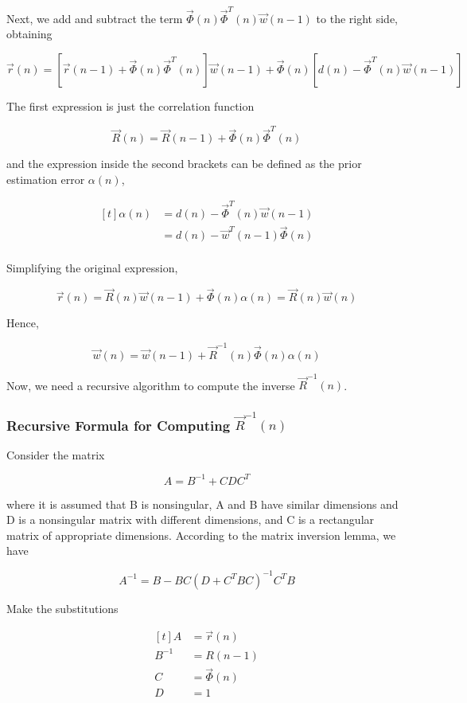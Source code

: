 \documentclass{article}
\begin{document}
Next, we add and subtract the term $ \vec{\Phi} (n) \vec{\Phi}^{T} (n) \vec{w} (n - 1) $ to the right side, obtaining

$$ \vec{r} (n) = [ \vec{r} (n - 1) + \vec{\Phi} (n) \vec{\Phi}^{T} (n) ] \vec{w} (n - 1) + \vec{\Phi} (n) [d (n) - \vec{\Phi}^{T} (n) \vec{w} (n - 1)] $$

The first expression is just the correlation function

$$ \vec{R} (n) = \vec{R} (n - 1) + \vec{\Phi} (n) \vec{\Phi}^{T} (n) $$

\noindent and the expression inside the second brackets can be defined as the prior estimation error $ \alpha (n) $, 

$$ 
\begin{aligned}[t]
	\alpha (n) &= d (n) - \vec{\Phi}^{T} (n) \vec{w} (n - 1) \\
		   &= d (n) - \vec{w}^{T} (n - 1) \vec{\Phi} (n) \\
\end{aligned}
$$

Simplifying the original expression,

$$ \vec{r} (n) = \vec{R} (n) \vec{w } (n - 1) + \vec{\Phi} (n) \alpha (n) = \vec{R} (n) \vec{w} (n) $$

Hence,

$$ \vec{w} (n) = \vec{w} (n - 1) + \vec{R}^{-1} (n) \vec{\Phi} (n) \alpha (n) $$

Now, we need a recursive algorithm to compute the inverse $ \vec{R}^{-1} (n) $.

\subsubsection{Recursive Formula for Computing $ \vec{R}^{-1} (n) $}

Consider the matrix

$$ A = B^{-1} + CDC^{T} $$

\noindent where it is assumed that B is nonsingular, A and B have similar dimensions and D is a nonsingular matrix with different dimensions, and C is a rectangular matrix of appropriate dimensions. According to the matrix inversion lemma, we have

$$ A^{-1} = B - BC (D + C^{T}BC)^{-1}C^{T}B $$

Make the substitutions

$$ 
\begin{aligned}[t]
	A &= \vec{r} (n)\\
	B^{-1} &= R (n - 1)\\
	C &= \vec{\Phi} (n)\\
	D &= 1
\end{aligned}
$$
\end{document}
